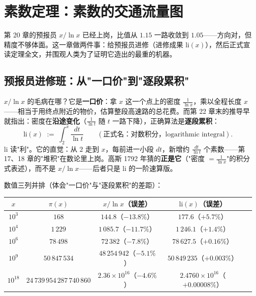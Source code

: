 \chapter{素数定理：素数的交通流量图}

第 20 章的预报员 $x/\ln x$ 已经上岗，比值从 $1.15$ 一路收敛到 $1.05$——方向对，但精度不够体面。这一章做两件事：给预报员进修（进修成果 $\mathrm{li}(x)$），然后正式宣读定理全文，并围观人类为了证明它造出的最重的机器。

\section{预报员进修班：从"一口价"到"逐段累积"}

$x/\ln x$ 的毛病在哪？它是\textbf{一口价}：拿 $x$ 这一个点上的密度 $\tfrac1{\ln x}$，乘以全程长度 $x$——相当于用终点附近的物价，估算整段高速路的总花费。而第 22 章末的推导早就指出：密度在\textbf{沿途变化}（$\tfrac1{\ln t}$ 随 $t$ 一路下降），正确算法是\textbf{逐段累积}：
\[
\mathrm{li}(x) \;:=\; \int_2^x \frac{dt}{\ln t} \qquad (\text{正式名：对数积分，logarithmic integral}).
\]
$\mathrm{li}$ 读"利"。它的直觉：从 $2$ 走到 $x$，每前进一小段 $dt$，新增约 $\tfrac{dt}{\ln t}$ 个素数——第 17、18 章的"堆积"在数论里上岗。高斯 1792 年猜的\textbf{正是它}（"密度 $= \tfrac1{\ln x}$"的积分式表述），而不是 $x/\ln x$——后者只是 $\mathrm{li}$ 的一阶速算版。

数值三列并排（体会"一口价"与"逐段累积"的差距）：

\begin{center}
\begin{tabular}{ccccc}
\toprule
$x$ & $\pi(x)$ & $x/\ln x$（误差） & $\mathrm{li}(x)$（误差） \\
\midrule
$10^3$ & $168$ & $144.8$（$-13.8\%$） & $177.6$（$+5.7\%$） \\
$10^4$ & $1\,229$ & $1\,085.7$（$-11.7\%$） & $1\,246.1$（$+1.4\%$） \\
$10^6$ & $78\,498$ & $72\,382$（$-7.8\%$） & $78\,627.5$（$+0.16\%$） \\
$10^9$ & $50\,847\,534$ & $48\,254\,942$（$-5.1\%$） & $50\,849\,235$（$+0.003\%$） \\
$10^{18}$ & $24\,739\,954\,287\,740\,860$ & $2.36\times10^{16}$（$-4.6\%$） & $2.4760\times10^{16}$（$+0.00008\%$） \\
\bottomrule
\end{tabular}
\end{center}

